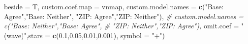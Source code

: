 \documentclass[
]{article}
\newenvironment{Shaded}{\begin{snugshade}}{\end{snugshade}}
\newcommand{\CommentTok}[1]{\textcolor[rgb]{0.56,0.35,0.01}{\textit{#1}}}
\newcommand{\DataTypeTok}[1]{\textcolor[rgb]{0.13,0.29,0.53}{#1}}
\newcommand{\FloatTok}[1]{\textcolor[rgb]{0.00,0.00,0.81}{#1}}
\newcommand{\KeywordTok}[1]{\textcolor[rgb]{0.13,0.29,0.53}{\textbf{#1}}}
\newcommand{\NormalTok}[1]{#1}
\newcommand{\StringTok}[1]{\textcolor[rgb]{0.31,0.60,0.02}{#1}}
\begin{document}
\begin{Shaded}
\begin{Highlighting}[]
          \DataTypeTok{beside =}\NormalTok{ T,}
          \DataTypeTok{custom.coef.map =}\NormalTok{ vnmap,}
          \DataTypeTok{custom.model.names =} \KeywordTok{c}\NormalTok{(}\StringTok{"Base: Agree"}\NormalTok{,}\StringTok{"Base: Neither"}\NormalTok{,}
                                 \StringTok{"ZIP: Agree"}\NormalTok{,}\StringTok{"ZIP: Neither"}\NormalTok{),}
          \CommentTok{# custom.model.names = c("Base: Neither","Base: Agree",}
          \CommentTok{#                        "ZIP: Neither","ZIP: Agree"),}
          \DataTypeTok{omit.coef =} \StringTok{"(wave)"}\NormalTok{,}\DataTypeTok{stars =} \KeywordTok{c}\NormalTok{(}\FloatTok{0.1}\NormalTok{,}\FloatTok{0.05}\NormalTok{,}\FloatTok{0.01}\NormalTok{,}\FloatTok{0.001}\NormalTok{), }\DataTypeTok{symbol =} \StringTok{"+"}\NormalTok{)}
\end{Highlighting}
\end{Shaded}
\end{document}
